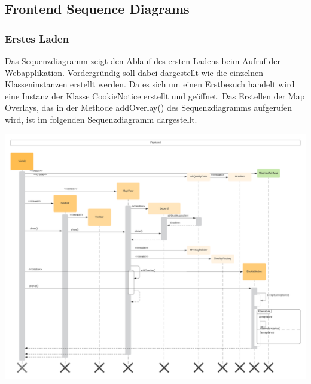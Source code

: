 \subsection{Frontend Sequence Diagrams}

\subsubsection{Erstes Laden}
\label{Erstes Laden}
Das Sequenzdiagramm zeigt den Ablauf des ersten Ladens beim Aufruf der Webapplikation. Vordergründig soll dabei dargestellt wie die einzelnen Klasseninstanzen erstellt werden. Da es sich um einen Erstbesuch handelt wird eine Instanz der Klasse CookieNotice erstellt und geöffnet. Das Erstellen der Map Overlays, das in der Methode addOverlay() des Sequenzdiagramms aufgerufen wird, ist im folgenden Sequenzdiagramm dargestellt. 
\begin{center}
	\includegraphics[width=1.2\textwidth]{media/frontend/sequence-diagram/sequenceFirstLoad.png} 
\end{center}

